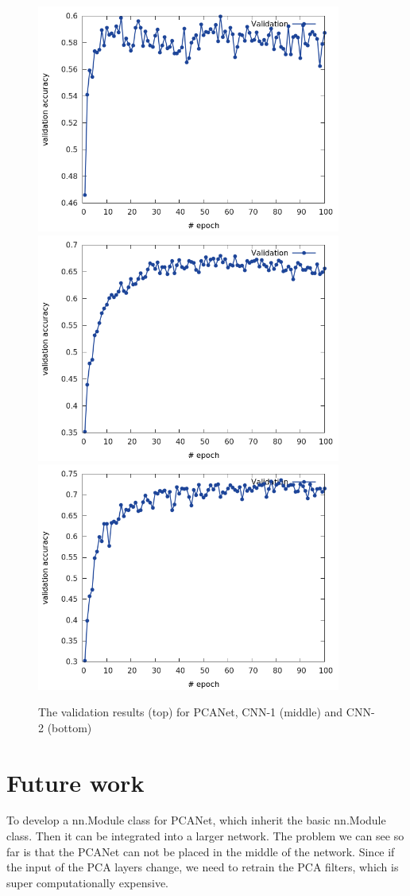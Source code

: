 \documentclass{article} %
\begin{document}
\begin{figure}[h]
	\begin{center}
		\includegraphics[scale=1.7,width=10cm]{PCANet_val_list.png} 
		\includegraphics[scale=1.7,width=10cm]{CNN_val_list.png}
		\includegraphics[scale=1.7,width=10cm]{DCNN_val_list.png}
	\end{center}
	\caption{The validation results (top) for PCANet, CNN-1 (middle) and CNN-2 (bottom)}\label{Fig: validation result}
\end{figure}

\section{Future work}
To develop a nn.Module class for PCANet, which inherit the basic nn.Module class. Then it can be integrated into a larger network. The problem we can see so far is that the PCANet can not be placed in the middle of the network. Since if the input of the PCA layers change, we need to retrain the PCA filters, which is super computationally expensive.

{}

\end{document}
